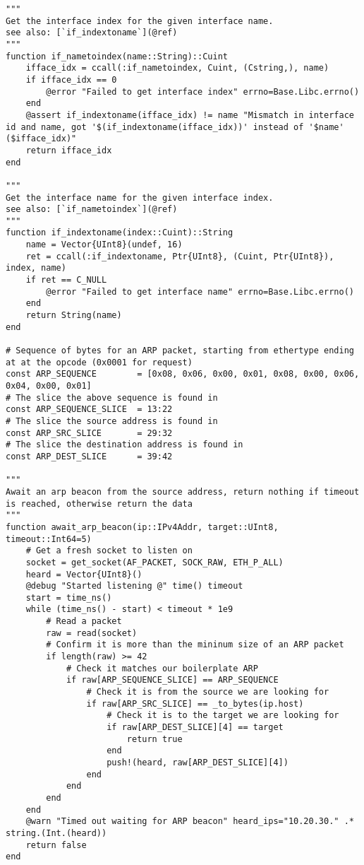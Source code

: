 \begin{lstlisting}[language=JuliaLocal, style=julia]
"""
Get the interface index for the given interface name.
see also: [`if_indextoname`](@ref)
"""
function if_nametoindex(name::String)::Cuint
    ifface_idx = ccall(:if_nametoindex, Cuint, (Cstring,), name)
    if ifface_idx == 0
        @error "Failed to get interface index" errno=Base.Libc.errno()
    end
    @assert if_indextoname(ifface_idx) != name "Mismatch in interface id and name, got '$(if_indextoname(ifface_idx))' instead of '$name' ($ifface_idx)"
    return ifface_idx
end

"""
Get the interface name for the given interface index.
see also: [`if_nametoindex`](@ref)
"""
function if_indextoname(index::Cuint)::String
    name = Vector{UInt8}(undef, 16)
    ret = ccall(:if_indextoname, Ptr{UInt8}, (Cuint, Ptr{UInt8}), index, name)
    if ret == C_NULL
        @error "Failed to get interface name" errno=Base.Libc.errno()
    end
    return String(name)
end

# Sequence of bytes for an ARP packet, starting from ethertype ending at at the opcode (0x0001 for request)
const ARP_SEQUENCE        = [0x08, 0x06, 0x00, 0x01, 0x08, 0x00, 0x06, 0x04, 0x00, 0x01]
# The slice the above sequence is found in
const ARP_SEQUENCE_SLICE  = 13:22
# The slice the source address is found in
const ARP_SRC_SLICE       = 29:32
# The slice the destination address is found in
const ARP_DEST_SLICE      = 39:42

"""
Await an arp beacon from the source address, return nothing if timeout is reached, otherwise return the data
"""
function await_arp_beacon(ip::IPv4Addr, target::UInt8, timeout::Int64=5)
    # Get a fresh socket to listen on
    socket = get_socket(AF_PACKET, SOCK_RAW, ETH_P_ALL)
    heard = Vector{UInt8}()
    @debug "Started listening @" time() timeout
    start = time_ns()
    while (time_ns() - start) < timeout * 1e9
        # Read a packet
        raw = read(socket)
        # Confirm it is more than the mininum size of an ARP packet
        if length(raw) >= 42
            # Check it matches our boilerplate ARP
            if raw[ARP_SEQUENCE_SLICE] == ARP_SEQUENCE
                # Check it is from the source we are looking for
                if raw[ARP_SRC_SLICE] == _to_bytes(ip.host)
                    # Check it is to the target we are looking for
                    if raw[ARP_DEST_SLICE][4] == target
                        return true
                    end
                    push!(heard, raw[ARP_DEST_SLICE][4])
                end
            end
        end
    end
    @warn "Timed out waiting for ARP beacon" heard_ips="10.20.30." .* string.(Int.(heard))
    return false
end
\end{lstlisting}
